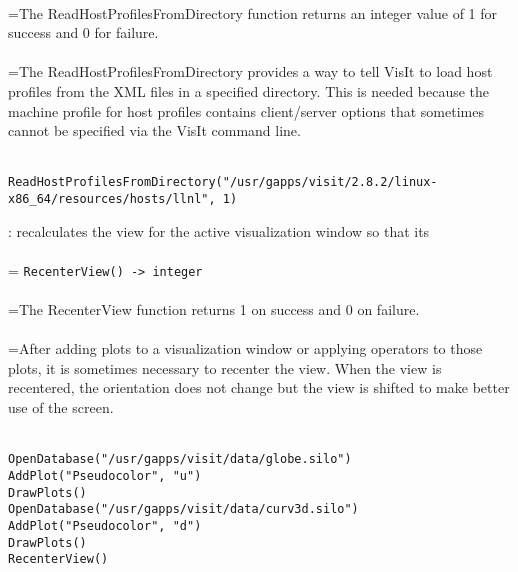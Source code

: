 \documentclass[10pt,a4paper]{report}
\begin{document}
 \\ 
\hangindent=\parindent The ReadHostProfilesFromDirectory function returns an integer value of 1 for success and 0 for failure. \\[-3mm] 

 \\ 
\hangindent=\parindent The ReadHostProfilesFromDirectory provides a way to tell VisIt to load host  profiles from the XML files in a specified directory. This is needed because the machine profile for host profiles contains client/server options that  sometimes cannot be specified via the VisIt command line. \\[-3mm] 

\\[-6mm]
\begin{verbatim}ReadHostProfilesFromDirectory("/usr/gapps/visit/2.8.2/linux-x86_64/resources/hosts/llnl", 1)
\end{verbatim}
\newpage


{}
: recalculates the view for the active visualization window so that its\\[-3mm]

 \\ 
\hangindent=\parindent 
\verb!RecenterView() -> integer!\\ [-3mm]

 \\ 
\hangindent=\parindent The RecenterView function returns 1 on success and 0 on failure. \\[-3mm] 

 \\ 
\hangindent=\parindent After adding plots to a visualization window or applying operators to those plots, it is sometimes necessary to recenter the view. When the view is recentered, the orientation does not change but the view is shifted to make better use of the screen. \\[-3mm] 

\\[-6mm]
\begin{verbatim}OpenDatabase("/usr/gapps/visit/data/globe.silo")
AddPlot("Pseudocolor", "u")
DrawPlots()
OpenDatabase("/usr/gapps/visit/data/curv3d.silo")
AddPlot("Pseudocolor", "d")
DrawPlots()
RecenterView()
\end{verbatim}
\newpage
\end{document}

